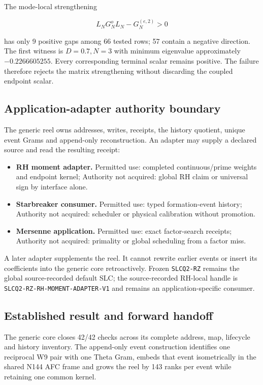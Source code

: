 The mode-local strengthening

\[
L_NG_N^oL_N-G_N^{(e,2)}>0
\]

has only 9 positive gaps among 66 tested rows; 57 contain a negative
direction. The first witness is \(D=0.7,N=3\) with minimum eigenvalue
approximately \(-0.2266605255\). Every corresponding terminal scalar
remains positive. The failure therefore rejects the matrix strengthening
without discarding the coupled endpoint scalar.

\subsection{Application-adapter authority
boundary}\label{viii-ch06-application-adapter-authority-boundary}

The generic reel owns addresses, writes, receipts, the history quotient,
unique event Grams and append-only reconstruction. An adapter may supply
a declared source and read the resulting receipt:

\begin{itemize}
\tightlist
\item
  \textbf{RH moment adapter.} Permitted use: completed continuous/prime
  weights and endpoint kernel; Authority not acquired: global RH claim
  or universal sign by interface alone.
\item
  \textbf{Starbreaker consumer.} Permitted use: typed formation-event
  history; Authority not acquired: scheduler or physical calibration
  without promotion.
\item
  \textbf{Mersenne application.} Permitted use: exact factor-search
  receipts; Authority not acquired: primality or global scheduling from
  a factor miss.
\end{itemize}

A later adapter supplements the reel. It cannot rewrite earlier events
or insert its coefficients into the generic core retroactively. Frozen
\texttt{SLCQ2-RZ} remains the global source-recorded default SLC; the
source-recorded RH-local handle is
\nolinkurl{SLCQ2-RZ-RH-MOMENT-ADAPTER-V1} and remains an
application-specific consumer.

\subsection{Established result and forward
handoff}\label{viii-ch06-established-result-and-forward-handoff}

The generic core closes 42/42 checks across its complete address, map,
lifecycle and history inventory. The append-only event construction
identifies one reciprocal W9 pair with one Theta Gram, embeds that event
isometrically in the shared N144 AFC frame and grows the reel by 143
ranks per event while retaining one common kernel.

